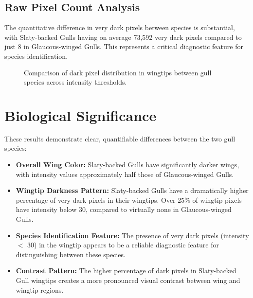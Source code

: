 \documentclass[a4paper,12pt]{report}
\begin{document}
\subsection{Raw Pixel Count Analysis}

The quantitative difference in very dark pixels between species is substantial, with Slaty-backed Gulls having on average 73,592 very dark pixels compared to just 8 in Glaucous-winged Gulls. This represents a critical diagnostic feature for species identification.

\begin{figure}[H]
\centering
{}
\caption{Comparison of dark pixel distribution in wingtips between gull species across intensity thresholds.}
\label{fig:pixel_distribution}
\end{figure}

\section{Biological Significance}

These results demonstrate clear, quantifiable differences between the two gull species:

\begin{itemize}
    \item \textbf{Overall Wing Color:} Slaty-backed Gulls have significantly darker wings, with intensity values approximately half those of Glaucous-winged Gulls.
    
    \item \textbf{Wingtip Darkness Pattern:} Slaty-backed Gulls have a dramatically higher percentage of very dark pixels in their wingtips. Over 25\% of wingtip pixels have intensity below 30, compared to virtually none in Glaucous-winged Gulls.
    
    \item \textbf{Species Identification Feature:} The presence of very dark pixels (intensity $<$ 30) in the wingtip appears to be a reliable diagnostic feature for distinguishing between these species.
    
    \item \textbf{Contrast Pattern:} The higher percentage of dark pixels in Slaty-backed Gull wingtips creates a more pronounced visual contrast between wing and wingtip regions.
\end{itemize}
\end{document}
